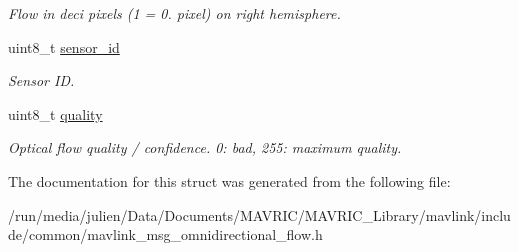\begin{DoxyCompactItemize}
\begin{DoxyCompactList}\small\item\em Flow in deci pixels (1 = 0. pixel) on right hemisphere. \end{DoxyCompactList}\item 
\hypertarget{struct____mavlink__omnidirectional__flow__t_ad79dccdf4b9ab58e42b65322e678a419}{uint8\+\_\+t \hyperlink{struct____mavlink__omnidirectional__flow__t_ad79dccdf4b9ab58e42b65322e678a419}{sensor\+\_\+id}}\label{struct____mavlink__omnidirectional__flow__t_ad79dccdf4b9ab58e42b65322e678a419}

\begin{DoxyCompactList}\small\item\em Sensor I\+D. \end{DoxyCompactList}\item 
\hypertarget{struct____mavlink__omnidirectional__flow__t_a36283403fc9a72621904ccea1fc2e8e1}{uint8\+\_\+t \hyperlink{struct____mavlink__omnidirectional__flow__t_a36283403fc9a72621904ccea1fc2e8e1}{quality}}\label{struct____mavlink__omnidirectional__flow__t_a36283403fc9a72621904ccea1fc2e8e1}

\begin{DoxyCompactList}\small\item\em Optical flow quality / confidence. 0\+: bad, 255\+: maximum quality. \end{DoxyCompactList}\end{DoxyCompactItemize}


The documentation for this struct was generated from the following file\+:\begin{DoxyCompactItemize}
\item 
/run/media/julien/\+Data/\+Documents/\+M\+A\+V\+R\+I\+C/\+M\+A\+V\+R\+I\+C\+\_\+\+Library/mavlink/include/common/mavlink\+\_\+msg\+\_\+omnidirectional\+\_\+flow.\+h\end{DoxyCompactItemize}
